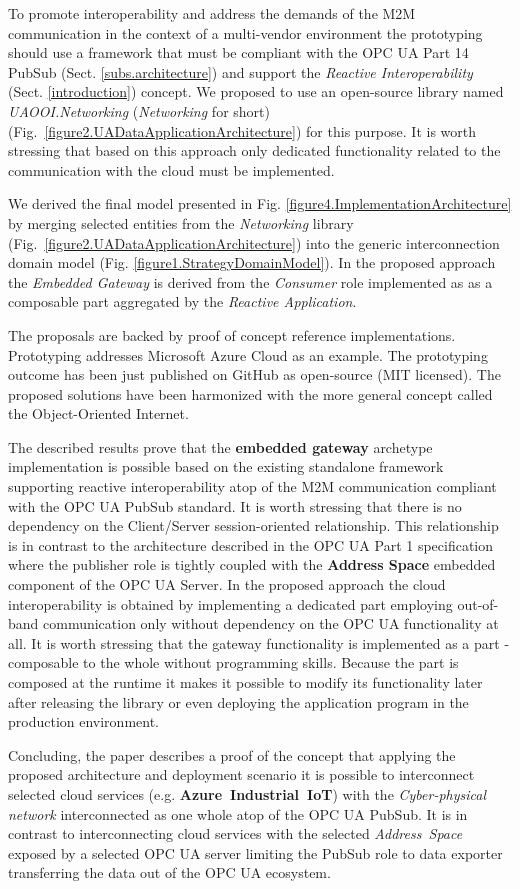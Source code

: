 \documentclass{article}
\begin{document}
To promote interoperability and address the demands of the M2M communication in the context of a multi-vendor environment the prototyping should use a framework that must be compliant with the OPC UA Part 14 PubSub (Sect. \ref*{subs.architecture}) and support the \emph{Reactive Interoperability} (Sect. \ref*{introduction}) concept. We proposed to use an open-source library named \emph{UAOOI.Networking} (\emph{Networking} for short) (Fig.~\ref*{figure2.UADataApplicationArchitecture}) for this purpose. It is worth stressing that based on this approach only dedicated functionality related to the communication with the cloud must be implemented.

We derived the final model presented in Fig. \ref*{figure4.ImplementationArchitecture} by merging selected entities from the \emph{Networking} library (Fig.~\ref*{figure2.UADataApplicationArchitecture}) into the generic interconnection domain model (Fig. \ref*{figure1.StrategyDomainModel}). In the proposed approach the \textit{Embedded Gateway} is derived from the \textit{Consumer} role implemented as as a composable part aggregated by the \textit{Reactive Application}.

The proposals are backed by proof of concept reference implementations. Prototyping addresses Microsoft Azure Cloud as an example. The prototyping outcome has been just published on GitHub as open-source (MIT licensed). The proposed solutions have been harmonized with the more general concept called the Object-Oriented Internet.

The described results prove that the \textbf{embedded gateway} archetype implementation is possible based on the existing standalone framework supporting reactive interoperability atop of the M2M communication compliant with the OPC UA PubSub standard. It is worth stressing that there is no dependency on the Client/Server session-oriented relationship. This relationship is in contrast to the architecture described in the OPC UA Part 1 \cite{OPCUAPart1} specification where the publisher role is tightly coupled with the \textbf{Address Space} embedded component of the OPC UA Server. In the proposed approach the cloud interoperability is obtained by implementing a dedicated part employing out-of-band communication only without dependency on the OPC UA functionality at all. It is worth stressing that the gateway functionality is implemented as a part - composable to the whole without programming skills. Because the part is composed at the runtime it makes it possible to modify its functionality later after releasing the library or even deploying the application program in the production environment.

Concluding, the paper describes a proof of the concept that applying the proposed architecture and deployment scenario it is possible to interconnect selected cloud services (e.g. \textbf{Azure\ Industrial\ IoT}) with the \emph{Cyber-physical network} interconnected as one whole atop of the OPC UA PubSub. It is in contrast to interconnecting cloud services with the selected \emph{ Address\ Space} exposed by a selected OPC UA server limiting the PubSub role to data exporter transferring the data out of the OPC UA ecosystem.



\end{document}
